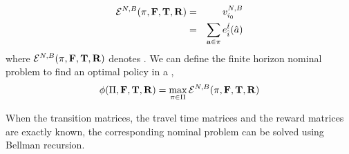 \begin{eqnarray}
\mathcal{E}^{N,B}(\pi, {\mathbf{F}}, {\mathbf{T}}, {\mathbf{R}}) &=& v_{{i_0}}^{N,B} \\
&=& \sum_{\mathbf{a} \in \pi}e_{\hat{i}}^{\hat{t}}({\hat{a}})
\end{eqnarray}
where $\mathcal{E}^{N,B}(\pi, {\mathbf{F}}, {\mathbf{T}}, {\mathbf{R}})$ denotes {\totalexpectedearnings}. We can define the finite horizon nominal problem to find an optimal policy in a {\mdp},
\begin{equation}
\label{eq:nominal_problem}
\phi(\Pi, {\mathbf{F}}, {\mathbf{T}}, {\mathbf{R}}) = \max_{\pi \in \Pi} \mathcal{E}^{N,B}(\pi, {\mathbf{F}}, {\mathbf{T}}, {\mathbf{R}})
\end{equation}

When the transition matrices, the travel time matrices and the reward matrices are exactly known, the corresponding nominal problem can be solved using Bellman recursion.